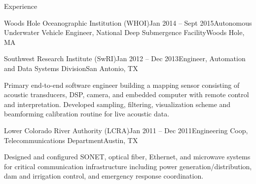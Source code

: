 \documentclass{resume} %
\begin{document}
\begin{rSection}{Experience}
\begin{rSubsection}{Woods Hole Oceanographic Institution (WHOI)}{Jan 2014 -- Sept 2015}{Autonomous Underwater Vehicle Engineer, National Deep Submergence Facility}{Woods Hole, MA}
\end{rSubsection}
	\vspace{-.2cm}
\begin{rSubsection}{Southwest Research Institute (SwRI)}{Jan 2012 -- Dec 2013}{Engineer, Automation and Data Systems Division}{San Antonio, TX}{}
\item{Primary end-to-end software engineer building a mapping sensor consisting of acoustic transducers, DSP, camera, and embedded computer with remote control and interpretation. Developed sampling, filtering, visualization scheme and beamforming calibration routine for live acoustic data.}
\end{rSubsection}
\begin{rSubsection}{Lower Colorado River Authority (LCRA)}{Jan 2011 -- Dec 2011}{Engineering Coop, Telecommunications Department}{Austin, TX}
\item{Designed and configured SONET, optical fiber, Ethernet, and microwave systems for critical communication infrastructure including power generation/distribution, dam and irrigation control, and emergency response coordination. }
\end{rSubsection}
\end{rSection}
	\vspace{-.5cm}
\end{document}
